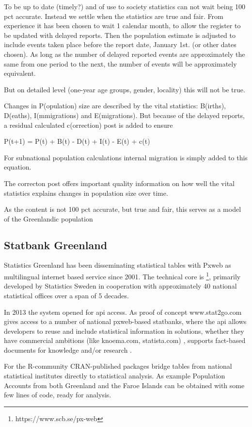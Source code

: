 \documentclass[USenglish]{article}
\begin{document}
To be up to date (timely?) and of use to society statistics can not wait being 100 pct accurate. Instead we settle when the statistics are true and fair. From experience it has been chosen to wait 1 calendar month, to allow the register to be updated with delayed reports. Then the population estimate is adjusted to include events taken place before the report date, January 1st. (or other dates chosen). As long as the number of delayed reported events are approximately the same from one period to the next, the number of events will be approximately equivalent.

But on detailed level (one-year age groups, gender, locality) this will not be true.

Changes in P(opulation) size are described by the vital statistics: B(irths), D(eaths), I(mmigrations) and E(migrations). But because of the delayed reports, a residual calculated c(orrection) post is added to ensure


P(t+1) = P(t) + B(t) - D(t) + I(t) - E(t) + c(t)


For subnational population calculations internal migration is simply added to this equation.

The correcton post offers important quality information on how well the vital statistics explains changes in population size over time.

As the content is not 100 pct accurate, but true and fair, this serves as a model of the Greenlandic population


\subsection{Statbank Greenland} 
Statistics Greenland has been disseminating statistical tables with Pxweb as multilingual internet based service since 2001. The technical core is \footnote[the Pxweb-family]{https://www.scb.se/px-web}, primarily developed by Statistics Sweden in cooperation with approximately 40 national statistical offices over a span of 5 decades. 

In 2013 the system opened for api access. As proof of concept www.stat2go.com gives access to a number of national pxweb-based statbanks, where the api allows developers to reuse and include statistical information in solutions, whether they have commercial ambitions (like knoema.com, statista.com) , supports fact-based documents for knowledge and/or research .

For the R-community CRAN-published packages bridge tables from national statistical institutes directly to statistical analysis. As example Population Accounts from both Greenland and the Faroe Islands can be obtained with some few lines of code, ready for analysis.
\end{document}
